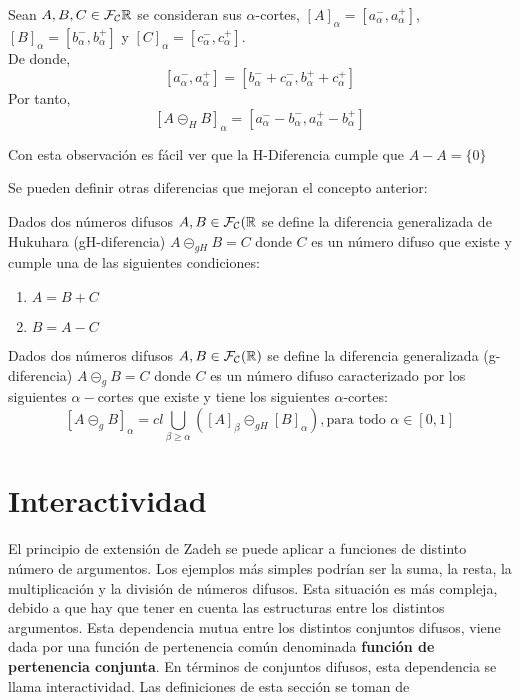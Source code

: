   \begin{observacion}
    Sean $A, B, C \in \mathcal{F}_\mathcal{C}\mathbb R$ se consideran sus $\alpha$-cortes, $[A]_\alpha = [a^-_\alpha, a^+_\alpha]$, $[B]_\alpha = [b^-_\alpha, b^+_\alpha]$ y $[C]_\alpha = [c^-_\alpha, c^+_\alpha]$. \\
    De donde,
    $$
    [a^-_\alpha, a^+_\alpha] = [b^-_\alpha + c^-_\alpha, b^+_\alpha + c^+_\alpha]
    $$
    Por tanto, 
    $$
    [A \circleddash_H B]_\alpha = [a_\alpha^- - b_\alpha^-, a_\alpha^+ - b_\alpha^+]
    $$
  \end{observacion}
  Con esta observación es fácil ver que la H-Diferencia cumple que $A-A=\{0\}$
 
  Se pueden definir otras diferencias que mejoran el concepto anterior:
  
  \begin{definicion}
  	Dados dos números difusos $A, B \in \mathcal{F}_\mathcal{C}(\mathbb R$ se define la diferencia generalizada de Hukuhara (gH-diferencia) $A\circleddash_{gH}B=C$ donde $C$ es un número difuso que existe y cumple una de las siguientes condiciones:
  	
  	\begin{enumerate}
  		\item $A=B+C$ 
  		\item $B=A-C$
  	\end{enumerate}
  \end{definicion}

  \begin{definicion}
	Dados dos números difusos $A, B \in \mathcal{F}_\mathcal{C}(\mathbb R)$ se define la diferencia generalizada (g-diferencia) $A\circleddash_{g}B=C$ donde $C$ es un número difuso caracterizado por los siguientes $\alpha-$cortes que existe y tiene los siguientes $\alpha$-cortes:
	\[
		[A \circleddash_{g} B]_\alpha = cl \bigcup_{\beta \geq \alpha} ([A]_\beta \circleddash_{gH} [B]_\alpha), \text{para todo } \alpha \in [0, 1]
	\]
  \end{definicion}

  \section{Interactividad}
  El principio de extensión de Zadeh se puede aplicar a funciones de distinto número de argumentos. Los ejemplos más simples podrían ser la suma, la resta, la multiplicación y la división de números difusos. Esta situación es más compleja, debido a que hay que tener en cuenta las estructuras entre los distintos argumentos. Esta dependencia mutua entre los distintos conjuntos difusos, viene dada por una función de pertenencia común denominada \textbf{función de pertenencia conjunta}. En términos de conjuntos difusos, esta dependencia se llama interactividad. Las definiciones de esta sección se toman de \cite{fuzzyeqn}

